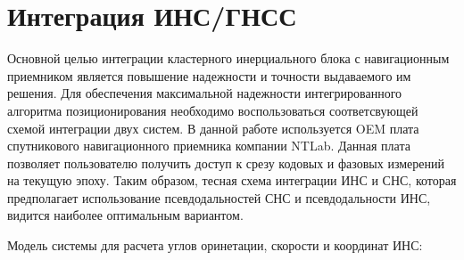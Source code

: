 \newpage
\section {Интеграция ИНС/ГНСС}

 
 Основной целью интеграции кластерного инерциального блока с навигационным приемником является повышение
 надежности и точности выдаваемого им решения. Для обеспечения максимальной надежности интегрированного алгоритма позиционирования необходимо воспользоваться соответсвующей схемой интеграции двух систем. 
 В данной работе используется OEM плата спутникового навигационного приемника компании NTLab. Данная плата позволяет пользователю получить доступ к срезу кодовых и фазовых измерений на текущую эпоху. Таким образом, тесная схема интеграции ИНС и СНС, которая предполагает использование псевдодальностей СНС и псевдодальности ИНС, видится наиболее оптимальным вариантом. 
 
 Модель системы для расчета углов оринетации, скорости и координат ИНС: 
 
 
 \begin{equation}
 	\label{eq:att_ins}
 	\begin{gathered}
	
 	\end{gathered}
 \end{equation}


\begin{equation}
	\label{eq:vel_ins}
	\begin{gathered}
		
	\end{gathered}
\end{equation}

\begin{equation}
	\label{eq:coord_ins}
	\begin{gathered}
		
	\end{gathered}
\end{equation}
 
 